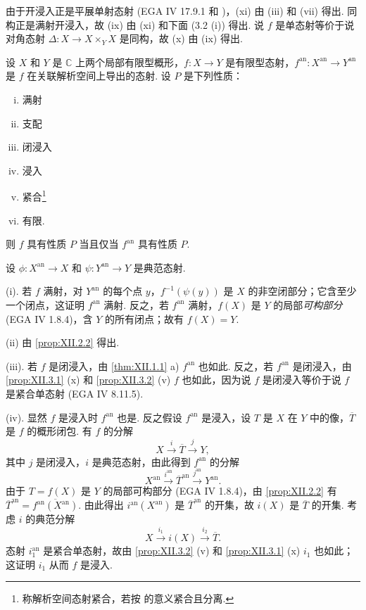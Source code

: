 由于开浸入正是平展单射态射 (EGA IV 17.9.1 和 \cite[第 13 号 §1]{exp12-4})，(xi) 由 (iii) 和 (vii) 得出. 同构正是满射开浸入，故 (ix) 由 (xi) 和下面 (3.2 (i)) 得出. 说 $f$ 是单态射等价于说对角态射 $\Delta \colon X \to X \times_Y X$ 是同构，故 (x) 由 (ix) 得出.

\begin{proposition}\label{prop:XII.3.2}
设 $X$ 和 $Y$ 是 $\mathbb{C}$ 上两个局部有限型概形，$f \colon X \to Y$ 是有限型态射，$f^{\mathrm{an}} \colon X^{\mathrm{an}} \to Y^{\mathrm{an}}$ 是 $f$ 在关联解析空间上导出的态射. 设 $P$ 是下列性质：
\begin{enumerate}[i)]
\item 满射
\item[ii)] 支配
\item[iii)] 闭浸入
\item[iv)] 浸入
\item[v)] 紧合\footnote{称解析空间态射紧合，若按 \cite[第 1 章 §10 第 1 号]{exp12-1} 的意义紧合且分离.}
\item[vi)] 有限.
\end{enumerate}
则 $f$ 具有性质 $P$ 当且仅当 $f^{\mathrm{an}}$ 具有性质 $P$.
\end{proposition}

设 $\phi \colon X^{\mathrm{an}} \to X$ 和 $\psi \colon Y^{\mathrm{an}} \to Y$ 是典范态射.

(i). 若 $f$ 满射，对 $Y^{\mathrm{an}}$ 的每个点 $y$，$f^{-1}(\psi(y))$ 是 $X$ 的非空闭部分；它含至少一个闭点，这证明 $f^{\mathrm{an}}$ 满射. 反之，若 $f^{\mathrm{an}}$ 满射，$f(X)$ 是 $Y$ 的局部\emph{可构部分} (EGA IV 1.8.4)，含 $Y$ 的所有闭点；故有 $f(X) = Y$.

(ii) 由 \ref{prop:XII.2.2} 得出.

(iii). 若 $f$ 是闭浸入，由 \ref{thm:XII.1.1} a) $f^{\mathrm{an}}$ 也如此. 反之，若 $f^{\mathrm{an}}$ 是闭浸入，由 \ref{prop:XII.3.1} (x) 和 \ref{prop:XII.3.2} (v) $f$ 也如此，因为说 $f$ 是闭浸入等价于说 $f$ 是紧合单态射 (EGA IV 8.11.5).

(iv). 显然 $f$ 是浸入时 $f^{\mathrm{an}}$ 也是. 反之假设 $f^{\mathrm{an}}$ 是浸入，设 $T$ 是 $X$ 在 $Y$ 中的像，$\overline{T}$ 是 $f$ 的概形闭包. 有 $f$ 的分解
\[
X \xrightarrow{i} \overline{T} \xrightarrow{j} Y,
\]
其中 $j$ 是闭浸入，$i$ 是典范态射，由此得到 $f^{\mathrm{an}}$ 的分解
\[
X^{\mathrm{an}} \xrightarrow{i^{\mathrm{an}}} \overline{T}^{\mathrm{an}} \xrightarrow{j^{\mathrm{an}}} Y^{\mathrm{an}}.
\]
由于 $T = f(X)$ 是 $Y$ 的局部可构部分 (EGA IV 1.8.4)，由 \ref{prop:XII.2.2} 有 $\overline{T}^{\mathrm{an}} = \overline{f^{\mathrm{an}}(X^{\mathrm{an}})}$. 由此得出 $i^{\mathrm{an}}(X^{\mathrm{an}})$ 是 $\overline{T}^{\mathrm{an}}$ 的开集，故 $i(X)$ 是 $\overline{T}$ 的开集. 考虑 $i$ 的典范分解
\[
X \xrightarrow{i_1} i(X) \xrightarrow{i_2} \overline{T}.
\]
态射 $i_1^{\mathrm{an}}$ 是紧合单态射，故由 \ref{prop:XII.3.2} (v) 和 \ref{prop:XII.3.1} (x) $i_1$ 也如此；这证明 $i_1$ 从而 $f$ 是浸入.

